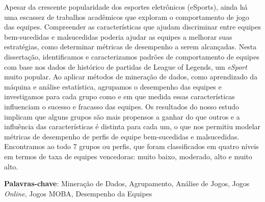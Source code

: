 Apesar da crescente popularidade dos esportes eletrônicos (eSports), ainda há uma escassez de trabalhos acadêmicos que exploram o comportamento de jogo das equipes. Compreender as características que ajudam discriminar entre equipes bem-sucedidas e malsucedidas poderia ajudar as equipes a melhorar suas estratégias, como determinar métricas de desempenho a serem alcançadas. Nesta dissertação, identificamos e caracterizamos padrões de comportamento de equipes com base nos dados de histórico de partidas de League of Legends, um \textit{eSport} muito popular. Ao aplicar métodos de mineração de dados, como aprendizado da máquina e análise estatística, agrupamos o desempenho das equipes e investigamos para cada grupo como e em que medida essas características influenciam o sucesso e fracasso das equipes. Os resultados do nosso estudo implicam que alguns grupos são mais propensos a ganhar do que outros e a influência das características é distinta para cada um, o que nos permitiu modelar métricas de desempenho de perfis de equipe bem-sucedidas e malsucedidas. Encontramos ao todo 7 grupos ou perfis, que foram classificados em quatro níveis em termos de taxa de equipes vencedoras: muito baixo, moderado, alto e muito alto.

\textbf{Palavras-chave}: Mineração de Dados, Agrupamento, Análise de Jogos, Jogos \textit{Online}, Jogos MOBA, Desempenho da Equipes